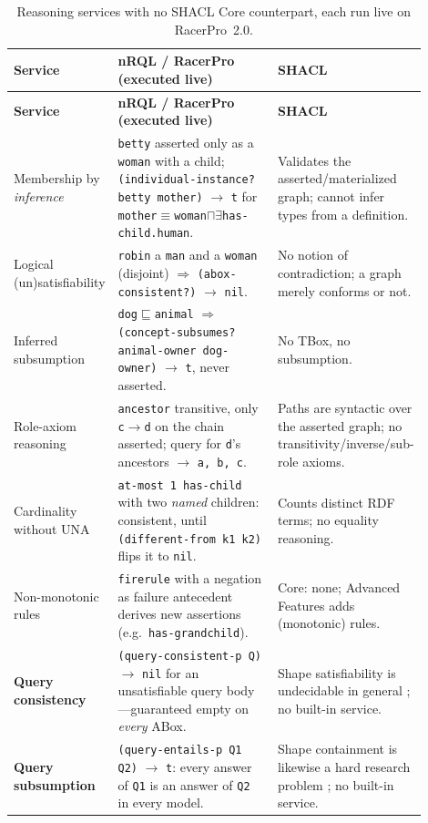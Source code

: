 \documentclass[11pt,letterpaper]{article}
\theoremstyle{definition}
\newcommand{\nrql}{nRQL}
\newcommand{\racer}{RacerPro}
\newcommand{\shacl}{SHACL}
\newcommand{\naf}{negation as failure}
\newcommand{\abox}{ABox}
\newcommand{\tbox}{TBox}
\newcommand{\rdf}{RDF}
\begin{document}
\begin{longtable}{p{0.235\linewidth}p{0.40\linewidth}p{0.27\linewidth}}
\caption{Reasoning services with no \shacl{} Core counterpart, each run live on \racer{}~2.0.}\label{tab:cantdo}\\
\toprule
\textbf{Service} & \textbf{\nrql{} / \racer{} (executed live)} & \textbf{\shacl{}} \\
\midrule
\endfirsthead
\toprule
\textbf{Service} & \textbf{\nrql{} / \racer{} (executed live)} & \textbf{\shacl{}} \\
\midrule
\endhead
\bottomrule
\endfoot
Membership by \emph{inference} & \texttt{betty} asserted only as a \texttt{woman} with a child; \texttt{(individual-instance? betty mother)} $\to$ \texttt{t} for \texttt{mother}$\equiv$\texttt{woman}$\sqcap\exists$\texttt{has-child.human}. & Validates the asserted/materialized graph; cannot infer types from a definition. \\
\addlinespace
Logical (un)satisfiability & \texttt{robin} a \texttt{man} and a \texttt{woman} (disjoint) $\Rightarrow$ \texttt{(abox-consistent?)} $\to$ \texttt{nil}. & No notion of contradiction; a graph merely conforms or not. \\
\addlinespace
Inferred subsumption & \texttt{dog}$\sqsubseteq$\texttt{animal} $\Rightarrow$ \texttt{(concept-subsumes? animal-owner dog-owner)} $\to$ \texttt{t}, never asserted. & No \tbox{}, no subsumption. \\
\addlinespace
Role-axiom reasoning & \texttt{ancestor} transitive, only \texttt{c}$\to$\texttt{d} on the chain asserted; query for \texttt{d}'s ancestors $\to$ \texttt{a, b, c}. & Paths are syntactic over the asserted graph; no transitivity/inverse/sub-role axioms. \\
\addlinespace
Cardinality without UNA & \texttt{at-most 1 has-child} with two \emph{named} children: consistent, until \texttt{(different-from k1 k2)} flips it to \texttt{nil}. & Counts distinct \rdf{} terms; no equality reasoning. \\
\addlinespace
Non-monotonic rules & \texttt{firerule} with a \naf{} antecedent derives new assertions (e.g.\ \texttt{has-grandchild}). & Core: none; Advanced Features adds (monotonic) rules. \\
\addlinespace
\textbf{Query consistency} & \texttt{(query-consistent-p Q)} $\to$ \texttt{nil} for an unsatisfiable query body---guaranteed empty on \emph{every} \abox{}. & Shape satisfiability is undecidable in general \cite{satcont}; no built-in service. \\
\addlinespace
\textbf{Query subsumption} & \texttt{(query-entails-p Q1 Q2)} $\to$ \texttt{t}: every answer of \texttt{Q1} is an answer of \texttt{Q2} in every model. & Shape containment is likewise a hard research problem \cite{satcont}; no built-in service. \\
\end{longtable}
\end{document}
